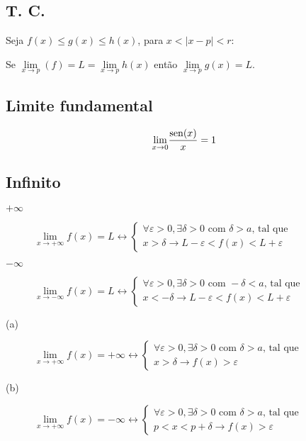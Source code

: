\documentclass[11pt]{article}
\newcommand{\sen}{{\rm sen}}
\newcommand{\limit}[3]{{
  \underset{#1 \rightarrow #2}{\lim} #3
}}
\begin{document}
\subsection{T. C.}

Seja $f(x) \leq g(x) \leq h(x)$, para $x < |x-p|<r$:

Se $\limit{x}{p}{(f)} = L = \limit{x}{p}{h(x)}$ então $\limit{x}{p}{g(x)} = L$.

\subsection{Limite fundamental}

$$\limit{x}{0}{\frac{\sen{(x)}}{x}} = 1$$

\subsection{Infinito}

\begin{description}
  \item[$+\infty$]
  $
  \limit{x}{+\infty}{f(x)} = L \leftrightarrow
    \begin{cases}
      \forall \varepsilon > 0 , \exists \delta > 0\text{ com } \delta >a\text{,
tal que} \\
      x > \delta \to L - \varepsilon < f(x)<L+\varepsilon
    \end{cases}
  $

  \item[$-\infty$]
  $
  \limit{x}{-\infty}{f(x)} = L \leftrightarrow
    \begin{cases}
      \forall \varepsilon > 0 , \exists \delta > 0\text{ com } -\delta<a\text{,
tal que} \\
      x < -\delta \to L - \varepsilon < f(x)<L+\varepsilon
    \end{cases}
  $

  \item[(a)]
  $
  \limit{x}{+\infty}{f(x)} = +\infty \leftrightarrow
    \begin{cases}
      \forall \varepsilon > 0 , \exists \delta > 0\text{ com } \delta>a\text{,
tal que} \\
      x>\delta \to f(x) > \varepsilon
    \end{cases}
  $

  \item[(b)]
  $
  \limit{x}{+\infty}{f(x)} = -\infty \leftrightarrow
    \begin{cases}
      \forall \varepsilon > 0 , \exists \delta > 0\text{ com } \delta>a\text{,
tal que} \\
      p<x<p+\delta \to f(x) > \varepsilon
    \end{cases}
  $
\end{description}
\end{document}
